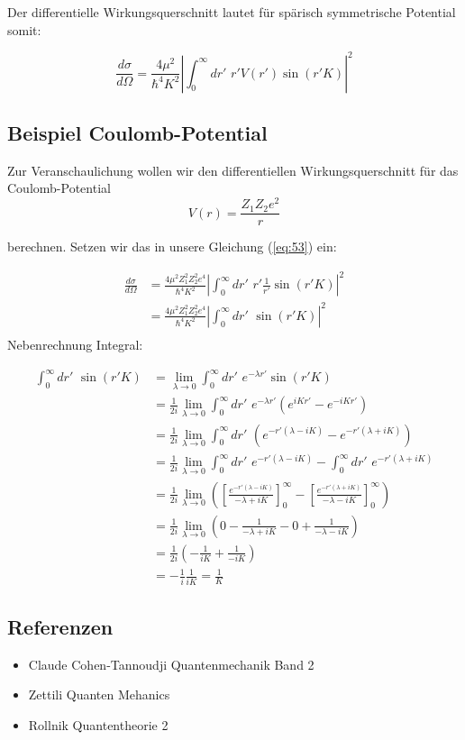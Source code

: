 Der differentielle Wirkungsquerschnitt lautet für spärisch symmetrische Potential somit:

\begin{equation}
  \label{eq:53}
  \boxed{ \frac{d\sigma}{d\Omega}=  \frac{4\mu^2}{\hbar^4 K^2} \left| \int_0^\infty dr'\,\, r'  V(r') \sin(r'K)   \right|^2 }
\end{equation}



\subsection{Beispiel Coulomb-Potential}


Zur Veranschaulichung wollen wir den differentiellen Wirkungsquerschnitt für das Coulomb-Potential 
\begin{equation}
  \label{eq:54}
  V(r) = \frac{Z_1Z_2e^2}{r}
\end{equation}

berechnen. Setzen wir das in unsere Gleichung (\ref{eq:53}) ein:

\begin{align}
  \label{eq:55}
  \frac{d\sigma}{d\Omega}&=  \frac{4\mu^2Z_1^2Z_2^2e^4}{\hbar^4 K^2} \left| \int_0^\infty dr'\,\, r'  \frac{1}{r'} \sin(r'K)   \right|^2 \\
&=  \frac{4\mu^2Z_1^2Z_2^2e^4}{\hbar^4 K^2} \left| \int_0^\infty dr'\,\, \sin(r'K)   \right|^2 \\
\end{align}
Nebenrechnung Integral:

\begin{align}
  \label{eq:56}
 \int_0^\infty dr'\,\, \sin(r'K) &= \lim_{\lambda \to 0} \int_0^\infty dr'\,\, e^{-\lambda r'}  \sin(r'K) \\
&= \frac{1}{2i}  \lim_{\lambda \to 0} \int_0^\infty dr'\,\, e^{-\lambda r'}\left( e^{iK r'}- e^{-iK r'} \right)  \\
&= \frac{1}{2i}  \lim_{\lambda \to 0} \int_0^\infty dr'\,\, \left( e^{-r'(\lambda - iK )}- e^{-r'(\lambda+iK)} \right)  \\
&= \frac{1}{2i}  \lim_{\lambda \to 0} \int_0^\infty dr'\,\, e^{-r'(\lambda - iK )}- \int_0^\infty dr'\,\, e^{-r'(\lambda+iK)}  \\
&= \frac{1}{2i}  \lim_{\lambda \to 0}\left( \left[ \frac{e^{-r'(\lambda - iK )} }{-\lambda+iK}  \right]_0^\infty - \left[ \frac{e^{-r'(\lambda + iK )} }{-\lambda-iK}  \right]_0^\infty \right) \\
&= \frac{1}{2i}  \lim_{\lambda \to 0}\left( 0 - \frac{1}{-\lambda+iK}   -  0  +  \frac{1}{-\lambda-iK}  \right) \\
&= \frac{1}{2i}  \left( -\frac{1}{iK}   +  \frac{1}{-iK}  \right) \\
&= - \frac{1}{i} \frac{1}{iK} =  \frac{1}{K} 
\end{align}






\subsection*{Referenzen}
\begin{itemize}
\item Claude Cohen-Tannoudji Quantenmechanik Band 2
\item Zettili Quanten Mehanics
\item Rollnik Quantentheorie 2
\end{itemize}


